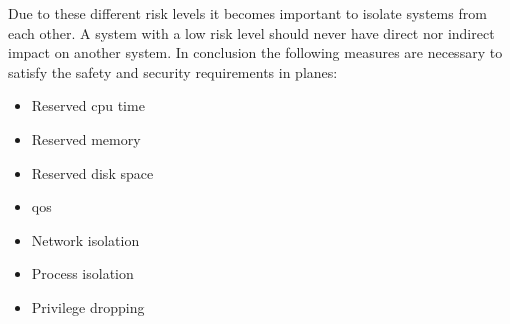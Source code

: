 \documentclass[titlepage]{report}
\begin{document}
Due to these different risk levels it becomes important to isolate systems from each other. A system
with a low risk level should never have direct nor indirect impact on another system. In conclusion
the following measures are necessary to satisfy the safety and security requirements in planes:

\begin{itemize}
    \item Reserved \gls{cpu} time
    \item Reserved memory
    \item Reserved disk space
    \item \gls{qos}
    \item Network isolation
    \item Process isolation
    \item Privilege dropping
\end{itemize}
\end{document}
